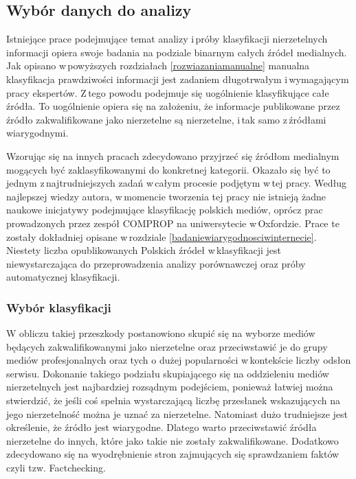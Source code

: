
\subsection{Wybór danych do analizy} \label{wybor-danych}
Istniejące prace podejmujące temat analizy i\,próby klasyfikacji nierzetelnych informacji opiera swoje badania na podziale binarnym całych źródeł medialnych\cite{marchal2019junk}\cite{tacchini2017some}. Jak opisano w\,powyższych rozdziałach \ref{rozwiazaniamanualne} manualna klasyfikacja prawdziwości informacji jest zadaniem długotrwałym i\,wymagającym pracy ekspertów. Z\,tego powodu podejmuje się uogólnienie klasyfikujące całe źródła. To uogólnienie opiera się na założeniu, że informacje publikowane przez źródło zakwalifikowane jako nierzetelne są nierzetelne, i\,tak samo z\,źródłami wiarygodnymi. 
\par
Wzorując się na innych pracach zdecydowano przyjrzeć się źródłom medialnym mogących być zaklasyfikowanymi do konkretnej kategorii. Okazało się być to jednym z\,najtrudniejszych zadań w\,całym procesie podjętym w\,tej pracy. Według najlepszej wiedzy autora, w\,momencie tworzenia tej pracy nie istnieją żadne naukowe inicjatywy podejmujące klasyfikację polskich mediów, oprócz prac prowadzonych przez zespół COMPROP na uniwersytecie w\,Oxfordzie. Prace te zostały dokładniej opisane w\,rozdziale \ref{badaniewiarygodnosciwinternecie}. Niestety liczba opublikowanych Polskich źródeł w\,klasyfikacji jest niewystarczająca do przeprowadzenia analizy porównawczej oraz próby automatycznej klasyfikacji. 
\subsubsection{Wybór klasyfikacji}
W obliczu takiej przeszkody postanowiono skupić się na wyborze mediów będących zakwalifikowanymi jako nierzetelne oraz przeciwstawić je do grupy mediów profesjonalnych oraz tych o dużej popularności w\,kontekście liczby odsłon serwisu. Dokonanie takiego podziału skupiającego się na oddzieleniu mediów nierzetelnych jest najbardziej rozsądnym podejściem, ponieważ łatwiej można stwierdzić, że jeśli coś spełnia wystarczającą liczbę przesłanek wskazujących na jego nierzetelność można je uznać za nierzetelne. Natomiast dużo trudniejsze jest określenie, że źródło jest wiarygodne. Dlatego warto przeciwstawić źródła nierzetelne do innych, które jako takie nie zostały zakwalifikowane. Dodatkowo zdecydowano się na wyodrębnienie stron zajmujących się sprawdzaniem faktów czyli tzw. Factchecking.
